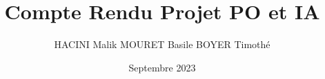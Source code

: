 \documentclass{article}
\title{Compte Rendu Projet PO et IA}
\author{HACINI Malik MOURET Basile BOYER Timothé}
\date{Septembre 2023}
\begin{document}
\tableofcontent{}
\end{document}
